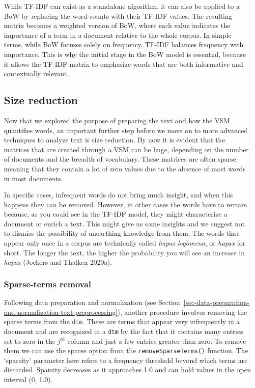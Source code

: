 While TF-IDF can exist as a standalone algorithm, it can also be applied
to a BoW by replacing the word counts with their TF-IDF
values. The resulting matrix becomes a weighted version of BoW, where
each value indicates the importance of a term in a document relative to
the whole corpus. In simple terms, while BoW focuses solely on
frequency, TF-IDF balances frequency with importance. This is why the
initial stage in the BoW model is essential, because it allows the
TF-IDF matrix to emphasize words that are both informative and
contextually relevant.

\subsection{Size reduction}\label{size-reduction}

Now that we explored the purpose of preparing the text and how the VSM
quantifies words, an important further step before we move on to more
advanced techniques to analyze text is size reduction. By now it is
evident that the matrices that are created through a VSM can be huge,
depending on the number of documents and the breadth of vocabulary.
These matrices are often sparse. meaning that they contain a lot of
zero values due to the absence of most words in most documents.

In specific cases, infrequent words do not bring much insight,
and when this happens they can be removed. However, in other cases the words have to
remain because, as you could see in the TF-IDF model, they might
characterize a document or enrich a text. This might give us some
insights and we suggest not to dismiss the possibility of unearthing
knowledge from them. The words that appear only once in a corpus are
technically called \emph{hapax legomena}, or \emph{hapax} for short. The
longer the text, the higher the probability you will see an increase in
\emph{hapax} (Jockers and Thalken 2020a).

\subsubsection{Sparse-terms removal}\label{sparse-terms-removal}

Following data preparation and normalization (see
Section~\ref{sec-data-preparation-and-normalization-text-preprocessing}),
another procedure involves removing the sparse terms from
the \texttt{dtm}. These are terms that appear very infrequently in a
document and are recognized in a \texttt{dtm} by the fact that it
contains many entries set to zero in the \(j^{th}\) column and just a
few entries greater than zero. To remove them we can use
the sparse option from the \texttt{removeSparseTerms()} function. The
`sparsity' parameter here refers to a frequency threshold beyond which
terms are discarded. Sparsity decreases as it approaches 1.0 and can
hold values in the open interval (0, 1.0).

